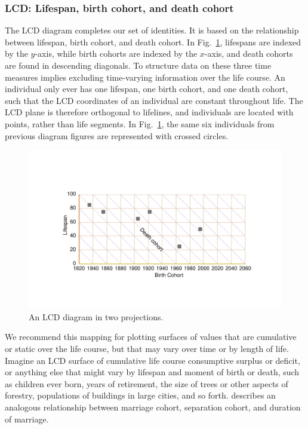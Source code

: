 \documentclass[12pt,oneside,a4paper,doublespacing]{article} %
\theoremstyle{definition}
\begin{document}
\FloatBarrier
\subsubsection{LCD: Lifespan, birth cohort, and death cohort}
\label{sec:lcd}
\FloatBarrier

The LCD diagram completes our set of identities. It is based on the relationship
between lifespan, birth cohort, and death cohort. In
Fig.~\ref{fig:LCD}, lifespans are indexed by the $y$-axis, while birth cohorts are indexed by the $x$-axis, and death cohorts
are found in descending diagonals. To structure data on these three
time measures implies excluding time-varying information over the life course.
An individual
only ever has one lifespan, one birth cohort, and one death cohort, such that
the LCD coordinates of an individual are constant throughout life.
The LCD plane is therefore orthogonal to lifelines, and individuals are located
with points, rather than life segments.
In Fig.~\ref{fig:LCD}, the same six individuals from previous diagram figures are represented with crossed circles.

\begin{figure}[h!] 
\caption{An LCD diagram in two projections.}
\label{fig:LCD}
\centering
\vspace{-5em}
\includegraphics[scale=0.8]{Figures/LCDrt.pdf}
\end{figure} 

We
recommend this mapping for plotting surfaces of values that are cumulative or
static over the life course, but that may vary over time or by length of life.
Imagine an LCD surface of cumulative life course consumptive surplus or deficit,
or anything else that might vary by lifespan and moment of birth or death, such as children ever born, years of retirement, the
size of trees or other aspects of forestry, populations of buildings in large
cities, and so forth. \citet{lexis1875einleitung} describes an analogous
relationship between marriage cohort, separation cohort, and duration of
marriage.
\end{document}
